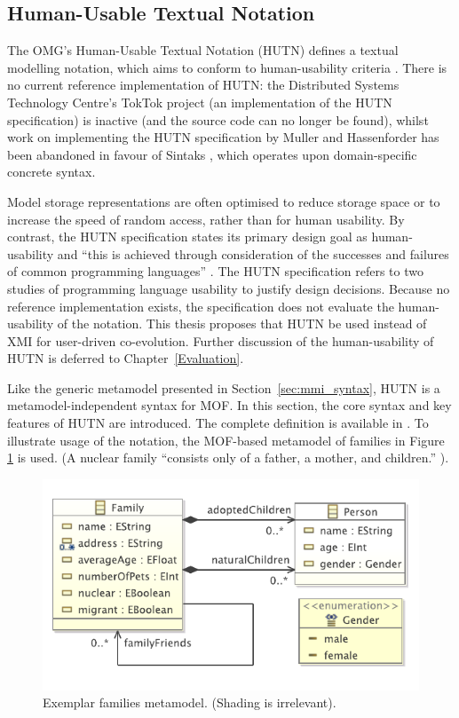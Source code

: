 \subsection{Human-Usable Textual Notation}
\label{subsec:hutn}
The OMG's Human-Usable Textual Notation (HUTN) \cite{hutn} defines a textual modelling notation, which aims to conform to human-usability criteria \cite{hutn}. There is no current reference implementation of HUTN: the Distributed Systems Technology Centre's TokTok project (an implementation of the HUTN specification) is inactive (and the source code can no longer be found), whilst work on implementing the HUTN specification by Muller and Hassenforder \cite{muller05hutn} has been abandoned in favour of Sintaks \cite{sintaks}, which operates upon domain-specific concrete syntax.

Model storage representations are often optimised to reduce storage space or to increase the speed of random access, rather than for human usability. By contrast, the HUTN specification states its primary design goal as human-usability and ``this is achieved through consideration of the successes and failures of common programming languages'' \cite[Section 2.2]{hutn}. The HUTN specification refers to two studies of programming language usability to justify design decisions. Because no reference implementation exists, the specification does not evaluate the human-usability of the notation. This thesis proposes that HUTN be used instead of XMI for user-driven co-evolution. Further discussion of the human-usability of HUTN is deferred to Chapter~\ref{Evaluation}.

Like the generic metamodel presented in Section~\ref{sec:mmi_syntax}, HUTN is a metamodel-independent syntax for 
MOF. In this section, the core syntax and key features of HUTN are introduced. The complete definition is available
in \cite{hutn}. To illustrate usage of the notation, the MOF-based metamodel of families in Figure \ref{fig:example-mm} is used. (A nuclear family ``consists only of a father, a mother, and children.'' \cite{nucleardef}).

\begin{figure}[htbp]
  \begin{center}
    \leavevmode
    \includegraphics[scale=0.85]{5.Implementation/families.pdf}
  \end{center}
  \caption{Exemplar families metamodel. (Shading is irrelevant).}
  \label{fig:example-mm}
\end{figure}


